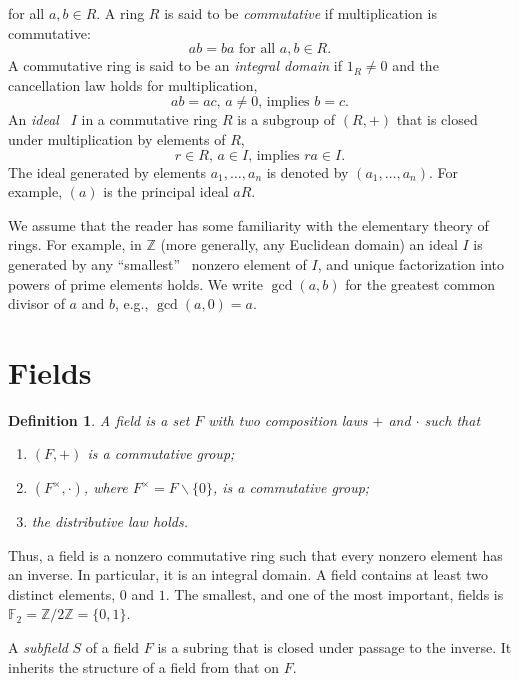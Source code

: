 \documentclass[a4paper,11pt,final,openany]{memoir}
\newtheorem{definition}[X]{Definition}
\theoremstyle{nonumberplain}
\begin{document}
\noindent for all $a,b\in R$. A ring $R$ is said to be \emph{commutative}%
if multiplication is commutative:
\[
ab=ba\text{ for all }a,b\in R.
\]
A commutative ring is said to be an \emph{integral domain}%
if $1_{R}\neq0$ and the cancellation law holds for multiplication,
\[
ab=ac\text{, }a\neq0\text{, implies }b=c.
\]
An \emph{ideal}%
%
\emph{\ }$I$ in a commutative ring $R$ is a subgroup of $(R,+)$ that is closed
under multiplication by elements of $R$,%
\[
r\in R\text{, }a\in I\text{, implies }ra\in I.
\]
The ideal generated by elements $a_{1},\ldots,a_{n}$ is denoted by
$(a_{1},\ldots,a_{n})$. For example, $(a)$ is the principal ideal $aR$.

We assume that the reader has some familiarity with the elementary theory of
rings. For example, in $\mathbb{Z}{}$ (more generally, any Euclidean domain)
an ideal $I$ is generated by any \textquotedblleft smallest\textquotedblright%
\ nonzero element of $I$, and unique factorization into powers of prime
elements holds. We write
%
$\gcd(a,b)$ for the greatest common divisor of $a$ and $b$, e.g.,
$\gcd(a,0)=a.$

\section{Fields}

\begin{definition}
\label{ef0}A \emph{field\/}%
is a set $F$ with two composition laws $+$ and $\cdot$ such that

\begin{enumerate}
\item $(F,+)$ is a commutative group;

\item $(F^{\times},\cdot)$, where $F^{\times}=F\smallsetminus\{0\}$, is a
commutative group;

\item the distributive law holds.
\end{enumerate}
\end{definition}

\noindent Thus, a field is a nonzero commutative ring such that every nonzero
element has an inverse. In particular, it is an integral domain. A field
contains at least two distinct elements, $0$ and $1$. The smallest, and one of
the most important, fields is $\mathbb{\mathbb{F}}_{2}=\mathbb{Z}%
/2\mathbb{Z}=\{0,1\}$.

A \emph{subfield}%
$S$ of a field $F$ is a subring that is closed under passage to the inverse.
It inherits the structure of a field from that on $F$.
\end{document}
